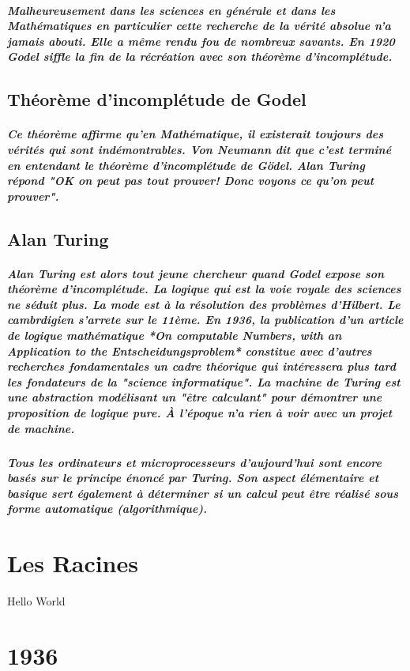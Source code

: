 \documentclass[a4paper, 11pt]{book}
\begin{document}
\paragraph{
  Malheureusement dans les sciences en générale et dans les Mathématiques en particulier cette recherche de la vérité absolue n'a jamais abouti. Elle a même rendu fou de nombreux savants. En 1920 Godel siffle la fin de la récréation avec son théorème d'incomplétude.
}

\section{Théorème d'incomplétude de Godel}

\paragraph{
  Ce théorème affirme qu'en Mathématique, il existerait toujours des vérités qui sont indémontrables.
  Von Neumann dit que c'est terminé en entendant le théorème d'incomplétude de Gödel. Alan Turing répond "OK on peut pas tout prouver! Donc voyons ce qu'on peut prouver".
}

\section{Alan Turing}

\paragraph{
  Alan Turing est alors tout jeune chercheur quand Godel expose son théorème d'incomplétude. La logique qui est la voie royale des sciences ne séduit plus. La mode est à la résolution des problèmes d'Hilbert. Le cambrdigien s'arrete sur le 11ème. En 1936, la publication d'un article de logique mathématique *On computable Numbers, with an Application to the Entscheidungsproblem* constitue avec d'autres recherches fondamentales un cadre théorique qui intéressera plus tard les fondateurs de la "science informatique". La machine de Turing est une abstraction modélisant un "être calculant" pour démontrer une proposition de logique pure. À l'époque n'a rien à voir avec un projet de machine.
}

\paragraph{
  Tous les ordinateurs et microprocesseurs d'aujourd'hui sont encore basés sur le principe énoncé par Turing. Son aspect élémentaire et basique sert également à déterminer si un calcul peut être réalisé sous forme automatique (algorithmique).
}

\chapter{Les Racines}

  Hello World

\chapter{1936}

\tableofcontents
\end{document}
